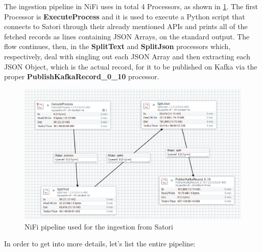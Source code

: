 The ingestion pipeline in NiFi uses in total 4 Processors, as shown in \ref{fig:nifipipeline}. The first Processor is \textbf{ExecuteProcess} and it is used to execute a Python script that connects to Satori through their already mentioned APIs and prints all of the fetched records as lines containing JSON Arrays, on the standard output. The flow continues, then, in the \textbf{SplitText} and \textbf{SplitJson} processors which, respectively, deal with singling out each JSON Array and then extracting each JSON Object, which is the actual record, for it to be published on Kafka via the proper \textbf{PublishKafkaRecord\_0\_10} processor.

\begin{figure}[ph]
    \centering
    \includegraphics[width=0.7\linewidth]{Figures/nifipipeline}
    \caption{NiFi pipeline used for the ingestion from Satori}
    \label{fig:nifipipeline}
\end{figure}

In order to get into more details, let's list the entire pipeline:

